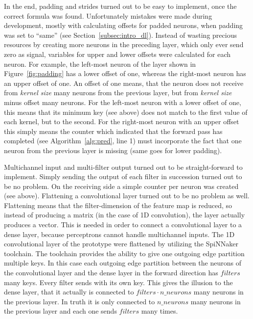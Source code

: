 \documentclass[]{article}
\begin{document}
In the end, padding and strides turned out to be easy to implement,
once the correct formula was found.
Unfortunately mistakes were made during development, mostly with
calculating offsets for padded neurons, when padding was set to
``same'' (see Section~\ref{subsec:intro_dl}).
Instead of wasting precious resources by creating more neurons in
the preceding layer, which only ever send zero as signal, variables
for upper and lower offsets were calculated for each neuron.
For example, the left-most neuron of the layer shown in
Figure~\ref{fig:padding} has a lower offset of one, whereas the
right-most neuron has an upper offset of one.
An offset of one means, that the neuron does not receive
from \textit{kernel size} many neurons from the previous layer, but
from \textit{kernel size} minus offset many neurons.
For the left-most neuron with a lower offset of one, this means that
its minimum key (see above) does not match to the first
value of each kernel, but to the second.
For the right-most neuron with an upper offset this simply means the
counter which indicated that the forward pass has completed
(see Algorithm~\ref{alg:pred}, line 1) must incorporate the fact
that one neuron from the previous layer is missing (same goes for
lower padding).

Multichannel input and multi-filter output turned out to be
straight-forward to implement.
Simply sending the output of each filter in succession turned out to
be no problem.
On the receiving side a simple counter per neuron was created
(see above).
Flattening a convolutional layer turned out to be no problem as well.
Flattening means that the filter-dimension of the feature map is
reduced, so instead of producing a matrix (in the case of 1D
convolution), the layer actually produces a vector.
This is needed in order to connect a convolutional layer to a dense
layer, because perceptrons cannot handle multichannel inputs.
The 1D convolutional layer of the prototype were flattened by
utilizing the SpiNNaker toolchain.
The toolchain provides the ability to give one outgoing edge partition
multiple keys.
In this case each outgoing edge partition between the neurons of the
convolutional layer and the dense layer in the forward direction has
$filters$ many keys.
Every filter sends with its own key.
This gives the illusion to the dense layer, that it actually is
connected to $filters \cdot n\_neurons$ many neurons in the previous
layer.
In truth it is only connected to $n\_neurons$ many neurons in the
previous layer and each one sends $filters$ many times.
\end{document}
